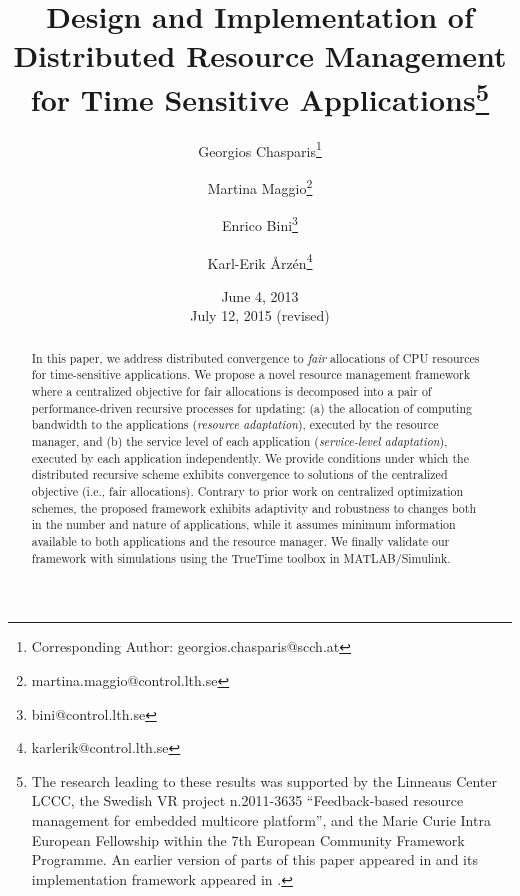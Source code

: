 \documentclass[letter,11pt]{article}
\begin{document}
\title{Design and  Implementation of Distributed Resource Management for Time
    Sensitive Applications\thanks{The research leading to these results was supported by the Linneaus
    Center LCCC, the Swedish VR project n.2011-3635 ``Feedback-based
    resource management for embedded multicore platform'', and the
    Marie Curie Intra European Fellowship within the 7th European
    Community Framework Programme. An earlier version of parts of this
    paper appeared in \cite{Cha13} and its implementation framework
    appeared in \cite{MagECRTS}.}  }
    
    \author[1]{Georgios Chasparis\thanks{Corresponding Author: georgios.chasparis@scch.at}}
    \author[2]{Martina Maggio\thanks{martina.maggio@control.lth.se}}
    \author[2]{Enrico Bini\thanks{bini@control.lth.se}}
    \author[2]{Karl-Erik \AA rz\'en\thanks{karlerik@control.lth.se}}
   
  
   

\date{June 4, 2013 \\ July 12, 2015 (revised)}

\maketitle

\begin{abstract}
In this paper, we address distributed convergence to \emph{fair} allocations of CPU resources for time-sensitive applications. We propose a novel resource management framework where a centralized objective for fair allocations is decomposed into a pair of performance-driven recursive processes for updating: (a) the allocation of computing bandwidth to the applications (\emph{resource adaptation}), executed by the resource manager, and (b) the service level of each application (\emph{service-level adaptation}), executed by each application independently. We provide conditions under which the distributed recursive scheme exhibits convergence to solutions of the centralized objective (i.e., fair allocations). Contrary to prior work on centralized optimization schemes, the proposed framework exhibits adaptivity and robustness to changes both in the number and nature of applications, while it assumes minimum information available to both applications and the resource manager. We finally validate our framework with simulations using the TrueTime toolbox in MATLAB/Simulink.
\end{abstract}
\end{document}
